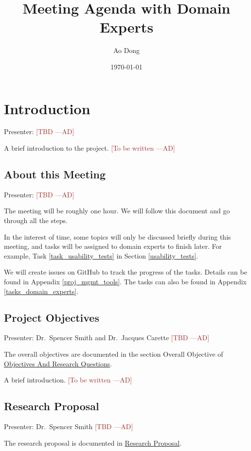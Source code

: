 \documentclass[12pt]{article}
\title{Meeting Agenda with Domain Experts}
\author{Ao Dong}
\date{\today}
\newcommand{\authornote}[3]{\textcolor{#1}{[#3 ---#2]}}
\newcommand{\authornote}[3]{}
\newcommand{\ad}[1]{\authornote{brown}{AD}{#1}} %
\begin{document}
\maketitle

\section{Introduction}
Presenter: \ad{TBD}

A brief introduction to the project. \ad{To be written}

\subsection{About this Meeting}
Presenter: \ad{TBD}

The meeting will be roughly one hour. We will follow this document and go
through all the steps.

In the interest of time, some topics will only be discussed briefly during this
meeting, and tasks will be assigned to domain experts to finish later. For
example, Task \ref{task_usability_tests} in Section \ref{usability_tests}.

We will create issues on GitHub to track the progress of the tasks. Details can
be found in Appendix \ref{proj_mgmt_tools}. The tasks can also be found in
Appendix \ref{tasks_domain_experts}.

\subsection{Project Objectives}
\label{project_objectives}
Presenter: Dr.\ Spencer Smith and Dr.\ Jacques Carette \ad{TBD}

The overall objectives are documented in the section Overall Objective of
\href{https://github.com/smiths/AIMSS/blob/master/OverallResearchProposal/ObjectivesAndResearchQuestions.pdf}{Objectives
And Research Questions}.

A brief introduction. \ad{To be written}

\subsection{Research Proposal}
\label{research_proposal}
Presenter: Dr.\ Spencer Smith \ad{TBD}

The research proposal is documented in
\href{https://github.com/smiths/AIMSS/blob/master/OverallResearchProposal/ResearchProposal.pdf}{Research
	Proposal}.
\end{document}
